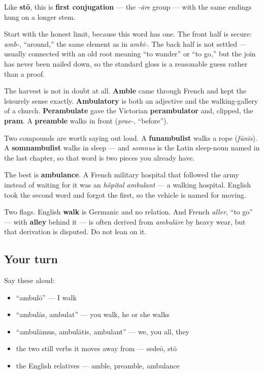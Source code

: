 Like \textbf{stō}, this is \textbf{first conjugation} — the \emph{-āre} group — with the same endings hung on a longer stem.

\begin{cousinweb}
Start with the honest limit, because this word has one. The front half is secure: \emph{amb-}, \textquotedblleft{}around,\textquotedblright{} the same element as in \emph{ambi-}. The back half is not settled — usually connected with an old root meaning \textquotedblleft{}to wander\textquotedblright{} or \textquotedblleft{}to go,\textquotedblright{} but the join has never been nailed down, so the standard gloss is a reasonable guess rather than a proof.

The harvest is not in doubt at all. \textbf{Amble} came through French and kept the leisurely sense exactly. \textbf{Ambulatory} is both an adjective and the walking-gallery of a church. \textbf{Perambulate} gave the Victorian \textbf{perambulator} and, clipped, the \textbf{pram}. A \textbf{preamble} walks in front (\emph{prae-}, \textquotedblleft{}before\textquotedblright{}).

Two compounds are worth saying out loud. A \textbf{funambulist} walks a rope (\emph{fūnis}). A \textbf{somnambulist} walks in sleep — and \emph{somnus} is the Latin sleep-noun named in the last chapter, so that word is two pieces you already have.

The best is \textbf{ambulance}. A French military hospital that followed the army instead of waiting for it was an \emph{hôpital ambulant} — a walking hospital. English took the second word and forgot the first, so the vehicle is named for moving.

Two flags. English \textbf{walk} is Germanic and no relation. And French \emph{aller}, \textquotedblleft{}to go\textquotedblright{} — with \textbf{alley} behind it — is often derived from \emph{ambulāre} by heavy wear, but that derivation is disputed. Do not lean on it.
\end{cousinweb}

\subsection*{Your turn}
Say these aloud:

\begin{itemize}
\raggedright
  \item \textquotedblleft{}ambulō\textquotedblright{} — I walk
  \item \textquotedblleft{}ambulās, ambulat\textquotedblright{} — you walk, he or she walks
  \item \textquotedblleft{}ambulāmus, ambulātis, ambulant\textquotedblright{} — we, you all, they
  \item the two still verbs it moves away from — sedeō, stō
  \item the English relatives — amble, preamble, ambulance
\end{itemize}

